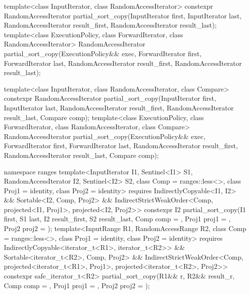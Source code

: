 %
\begin{itemdecl}
template<class InputIterator, class RandomAccessIterator>
  constexpr RandomAccessIterator
    partial_sort_copy(InputIterator first, InputIterator last,
                      RandomAccessIterator result_first,
                      RandomAccessIterator result_last);
template<class ExecutionPolicy, class ForwardIterator, class RandomAccessIterator>
  RandomAccessIterator
    partial_sort_copy(ExecutionPolicy&& exec,
                      ForwardIterator first, ForwardIterator last,
                      RandomAccessIterator result_first,
                      RandomAccessIterator result_last);

template<class InputIterator, class RandomAccessIterator,
         class Compare>
  constexpr RandomAccessIterator
    partial_sort_copy(InputIterator first, InputIterator last,
                      RandomAccessIterator result_first,
                      RandomAccessIterator result_last,
                      Compare comp);
template<class ExecutionPolicy, class ForwardIterator, class RandomAccessIterator,
         class Compare>
  RandomAccessIterator
    partial_sort_copy(ExecutionPolicy&& exec,
                      ForwardIterator first, ForwardIterator last,
                      RandomAccessIterator result_first,
                      RandomAccessIterator result_last,
                      Compare comp);

namespace ranges {
  template<InputIterator I1, Sentinel<I1> S1, RandomAccessIterator I2, Sentinel<I2> S2,
           class Comp = ranges::less<>, class Proj1 = identity, class Proj2 = identity>
    requires IndirectlyCopyable<I1, I2> && Sortable<I2, Comp, Proj2> &&
             IndirectStrictWeakOrder<Comp, projected<I1, Proj1>, projected<I2, Proj2>>
    constexpr I2
      partial_sort_copy(I1 first, S1 last, I2 result_first, S2 result_last,
                        Comp comp = {}, Proj1 proj1 = {}, Proj2 proj2 = {});
  template<InputRange R1, RandomAccessRange R2, class Comp = ranges::less<>,
           class Proj1 = identity, class Proj2 = identity>
    requires IndirectlyCopyable<iterator_t<R1>, iterator_t<R2>> &&
             Sortable<iterator_t<R2>, Comp, Proj2> &&
             IndirectStrictWeakOrder<Comp, projected<iterator_t<R1>, Proj1>,
                                     projected<iterator_t<R2>, Proj2>>
    constexpr safe_iterator_t<R2>
      partial_sort_copy(R1&& r, R2&& result_r, Comp comp = {},
                        Proj1 proj1 = {}, Proj2 proj2 = {});
}
\end{itemdecl}


